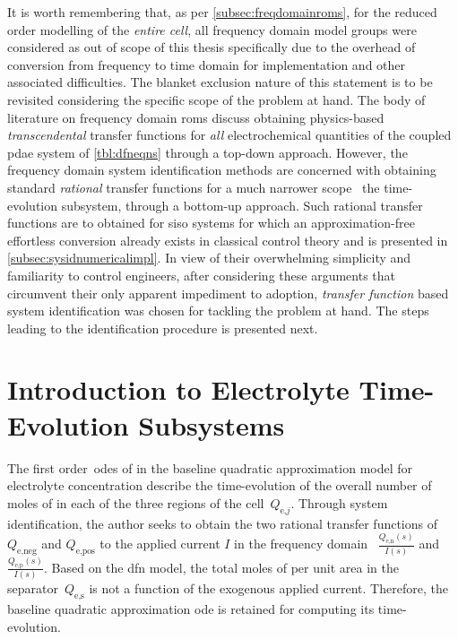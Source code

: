 It  is  worth remembering  that,  as  per \cref{subsec:freqdomainroms}, for  the
reduced order  modelling of the  \emph{entire cell}, all frequency  domain model
groups were considered  as out of scope  of this thesis specifically  due to the
overhead  of conversion  from frequency  to time  domain for  implementation and
other associated difficulties. The blanket exclusion nature of this statement is
to be revisited considering the specific scope  of the problem at hand. The body
of literature  on frequency  domain \glspl{rom} discuss  obtaining physics-based
\emph{transcendental}   transfer   functions  for   \emph{all}   electrochemical
quantities  of the  coupled  \gls{pdae} system  of \cref{tbl:dfneqns} through  a
top-down approach.  However, the frequency domain  system identification methods
are concerned with  obtaining standard \emph{rational} transfer  functions for a
much narrower  scope \viz~the time-evolution  subsystem, through  a bottom-up
approach.  Such  rational transfer  functions  are  to obtained  for  \gls{siso}
systems for which an approximation-free  effortless conversion already exists in
classical control  theory and is  presented in \cref{subsec:sysidnumericalimpl}.
In view of  their overwhelming simplicity and familiarity  to control engineers,
after considering these arguments that circumvent their only apparent impediment
to adoption, \emph{transfer function} based system identification was chosen for
tackling the problem at hand. The  steps leading to the identification procedure
is presented next.

\section{Introduction to Electrolyte Time-Evolution Subsystems}\label{sec:introtoplant}

The                  first                 order~\glspl{ode}                  of
 in the baseline
quadratic  approximation  model  for   electrolyte  concentration  describe  the
time-evolution of the overall number of moles  of  in each of the three
regions of the cell~$Q_{\text{e,}j}$.  Through system identification, the author
seeks  to  obtain  the  two  rational  transfer  functions  of~$Q_\text{e,neg}$
and  $Q_\text{e,pos}$  to  the  applied  current $I$  in  the  frequency  domain
\ie~$\frac{Q_\text{e,n}(s)}{I(s)}$ and~$\frac{Q_\text{e,p}(s)}{I(s)}$. Based on
the  \gls{dfn}  model,  the total  moles  of    per  unit area  in  the
separator~$Q_\text{e,s}$  is not a  function of the exogenous  applied current.
Therefore,  the  baseline  quadratic  approximation \gls{ode}  is  retained  for
computing its time-evolution.

